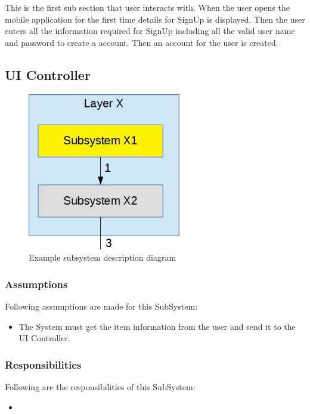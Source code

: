 This is the first sub section that user interacts with. When the user opens the mobile application for the first time details for SignUp is displayed. Then the user enters all the information required for SignUp including all the valid user name and password to create a account. Then an account for the user is created.

\subsection{UI Controller}


\begin{figure}[h!]
	\centering
 	\includegraphics[width=0.60\textwidth]{images/subsystem}
 \caption{Example subsystem description diagram}
\end{figure}

\subsubsection{Assumptions}
Following assumptions are made for this SubSystem:
\begin{itemize}
    \item The System must get the item information from the user and send it to the UI Controller.
\end{itemize}

\subsubsection{Responsibilities}
Following are the responsibilities of this SubSystem:
\begin{itemize}
    \item 
\end{itemize}

